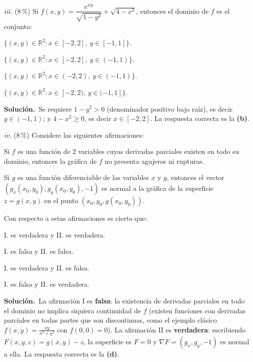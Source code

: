 \documentclass[11pt]{article}
\newcommand{\sol}{\medskip\noindent\textbf{\textcolor{solgreen}{Soluci\'on.}}\ }
\begin{document}
\medskip
\noindent\textit{iii.} (8\,\%) Si $f(x,y)=\dfrac{e^{xy}}{\sqrt{1-y^2}}+\sqrt{4-x^2}$, entonces el dominio de $f$ es el conjunto:

\begin{opciones}
  \item $\{(x,y)\in\mathbb{R}^2 : x\in[-2,2],\ y\in[-1,1]\}$.
  \item $\{(x,y)\in\mathbb{R}^2 : x\in[-2,2],\ y\in(-1,1)\}$.
  \item $\{(x,y)\in\mathbb{R}^2 : x\in(-2,2),\ y\in(-1,1)\}$.
  \item $\{(x,y)\in\mathbb{R}^2 : x\in[-2,2),\ y\in(-1,1]\}$.
\end{opciones}

\sol Se requiere $1-y^2>0$ (denominador positivo bajo ra\'iz), es decir $y\in(-1,1)$; y $4-x^2\geq 0$, es decir $x\in[-2,2]$. La respuesta correcta es la \textbf{(b)}.

\medskip
\noindent\textit{iv.} (8\,\%) Considere las siguientes afirmaciones:
\begin{romopc}
  \item Si $f$ es una funci\'on de 2 variables cuyas derivadas parciales existen en todo su dominio, entonces la gr\'afica de $f$ no presenta agujeros ni rupturas.
  \item Si $g$ es una funci\'on diferenciable de las variables $x$ y $y$, entonces el vector $(g_x(x_0,y_0),g_y(x_0,y_0),-1)$ es normal a la gr\'afica de la superficie $z=g(x,y)$ en el punto $(x_0,y_0,g(x_0,y_0))$.
\end{romopc}

Con respecto a estas afirmaciones es cierto que:
\begin{opciones}
  \item I. es verdadera y II. es verdadera.
  \item I. es falsa y II. es falsa.
  \item I. es verdadera y II. es falsa.
  \item I. es falsa y II. es verdadera.
\end{opciones}

\sol La afirmaci\'on I es \textbf{falsa}: la existencia de derivadas parciales en todo el dominio no implica siquiera continuidad de $f$ (existen funciones con derivadas parciales en todas partes que son discontinuas, como el ejemplo cl\'asico $f(x,y)=\frac{xy}{x^2+y^2}$ con $f(0,0)=0$). La afirmaci\'on II es \textbf{verdadera}: escribiendo $F(x,y,z)=g(x,y)-z$, la superficie es $F=0$ y $\nabla F=(g_x,g_y,-1)$ es normal a ella. La respuesta correcta es la \textbf{(d)}.
\end{document}
